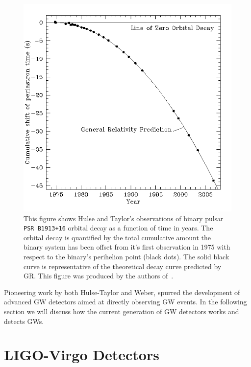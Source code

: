 \begin{figure}
    \centering
    \includegraphics[width=\linewidth]{figures/Hulse_taylor_pulsar.png}
    \caption[Hulse-Taylor binary pulsar decay.]{This figure shows Hulse 
    and Taylor's observations of binary pulsar \texttt{PSR B1913+16} 
    orbital decay as a function of time in years. The orbital decay is quantified by the total cumulative amount the binary system has been offset from it's first observation in 1975 with respect to the binary's perihelion point (black dots). The solid black curve is representative of the theoretical decay curve predicted by \ac{GR}. This figure was produced by the authors of~\cite{1975ApJ...195L..51H}. }
    \label{fig:hulse_taylor_decay}
\end{figure}

Pioneering work by both Hulse-Taylor and Weber, spurred the development 
of advanced \ac{GW} detectors aimed at directly observing 
\ac{GW} events. In the following section we will discuss how the current 
generation of \ac{GW} detectors works and detects \ac{GW}s.

\section{LIGO-Virgo Detectors}

